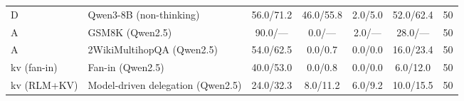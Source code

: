 \begin{table}[t]
\begin{tabular}{llccccc}
D            & Qwen3-8B (non-thinking)     & 56.0/71.2 & 46.0/55.8& 2.0/5.0  & 52.0/62.4 & 50 \\
A            & GSM8K (Qwen2.5)             & 90.0/---  & 0.0/---  & 2.0/---  & 28.0/---  & 50 \\
A            & 2WikiMultihopQA (Qwen2.5)   & 54.0/62.5 & 0.0/0.7  & 0.0/0.0  & 16.0/23.4 & 50 \\
kv (fan-in)  & Fan-in (Qwen2.5)            & 40.0/53.0 & 0.0/0.8  & 0.0/0.0  & 6.0/12.0  & 50 \\
kv (RLM+KV)  & Model-driven delegation (Qwen2.5) & 24.0/32.3 & 8.0/11.2 & 6.0/9.2  & 10.0/15.5 & 50 \\
\bottomrule
\end{tabular}
\end{table}
